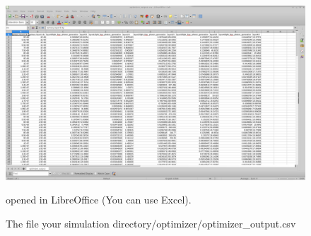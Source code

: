 \begin{figure}
\centering
\includegraphics[width=\linewidth]{./images/scan_optimizer_output.png}
\caption{The file your simulation directory/optimizer/optimizer\_output.csv} opened in LibreOffice (You can use Excel).
\label{fig:device_optimizer_output}
\end{figure}
\vfill
